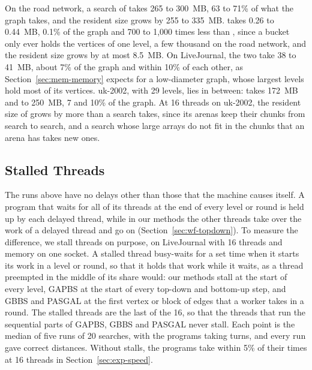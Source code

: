 On the road network, a search of \wfdo takes 265 to 300~MB, 63 to 71\% of what the graph takes, and the resident size grows by 255 to 335~MB. \wfdomem takes 0.26 to 0.44~MB, 0.1\% of the graph and 700 to 1,000 times less than \wfdo, since a bucket only ever holds the vertices of one level, a few thousand on the road network, and the resident size grows by at most 8.5~MB. On LiveJournal, the two take 38 to 41~MB, about 7\% of the graph and within 10\% of each other, as Section~\ref{sec:mem-memory} expects for a low-diameter graph, whose largest levels hold most of its vertices. uk-2002, with 29 levels, lies in between: \wfdomem takes 172~MB and  to 250~MB, 7 and 10\% of the graph. At 16 threads on uk-2002, the resident size of \wfdo grows by more than a search takes, since its arenas keep their chunks from search to search, and a search whose large arrays do not fit in the chunks that an arena has takes new ones.

\subsection{Stalled Threads}
\label{sec:exp-stalls}

The runs above have no delays other than those that the machine causes itself. A program that waits for all of its threads at the end of every level or round is held up by each delayed thread, while in our methods the other threads take over the work of a delayed thread and go on (Section~\ref{sec:wf-topdown}). To measure the difference, we stall threads on purpose, on LiveJournal with 16 threads and memory on one socket. A stalled thread busy-waits for a set time when it starts its work in a level or round, so that it holds that work while it waits, as a thread preempted in the middle of its share would: our methods stall at the start of every level, GAPBS at the start of every top-down and bottom-up step, and GBBS and PASGAL at the first vertex or block of edges that a worker takes in a round. The stalled threads are the last of the 16, so that the threads that run the sequential parts of GAPBS, GBBS and PASGAL never stall. Each point is the median of five runs of 20 searches, with the programs taking turns, and every run gave correct distances. Without stalls, the programs take within 5\% of their times at 16 threads in Section~\ref{sec:exp-speed}.

\dataStallCount
{}\dataStallLength

